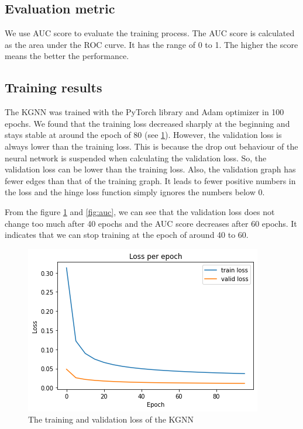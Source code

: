 \documentclass[11pt,twoside]{report}
\begin{document}
\subsection{Evaluation metric}
We use AUC score to evaluate the training process. The AUC score is calculated as the area under the ROC curve. It has the range of 0 to 1. The higher the score means the better the performance.

\subsection{Training results}
The KGNN was trained with the PyTorch library and Adam optimizer in 100 epochs. We found that the training loss decreased sharply at the beginning and stays stable at around the epoch of 80 (see \ref{fig:training_loss}). However, the validation loss is always lower than the training loss. This is because the drop out behaviour of the neural network is suspended when calculating the validation loss. So, the validation loss can be lower than the training loss. Also, the validation graph has fewer edges than that of the training graph. It leads to fewer positive numbers in the loss and the hinge loss function simply ignores the numbers below 0. 

From the figure \ref{fig:training_loss} and \ref{fig:auc}, we can see that the validation loss does not change too much after 40 epochs and the AUC score decreases after 60 epochs. It indicates that we can stop training at the epoch of around 40 to 60.

\begin{figure}[H]
    \centering
    \includegraphics[scale=0.9]{loss.png}
    \caption{The training and validation loss of the KGNN}
    \label{fig:training_loss}
\end{figure}
\end{document}
